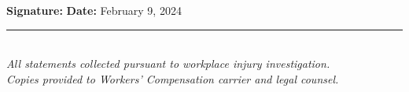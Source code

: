 \documentclass[11pt]{article}
\begin{document}
\vspace{1em}

\noindent\textbf{Signature:} \underline{\hspace{5cm}} \hfill \textbf{Date:} February 9, 2024

\vspace{2em}

\begin{center}
\rule{10cm}{0.4pt}\\[1em]
\small\textit{All statements collected pursuant to workplace injury investigation.\\
Copies provided to Workers' Compensation carrier and legal counsel.}
\end{center}
\end{document}
